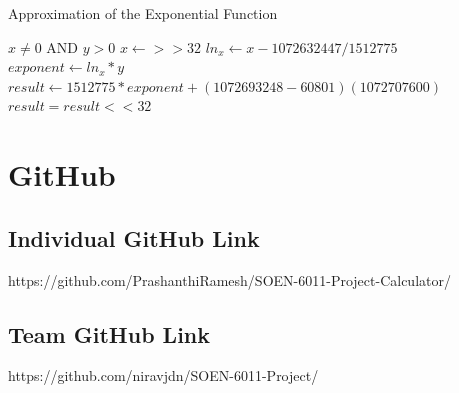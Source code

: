 \documentclass[11pt, english]{report}
\begin{document}
\begin{algorithm}
\caption{Approximation of the Exponential Function}\label{exp2}
\begin{algorithmic}[1]
\Require $x \neq 0$ AND $y > 0$
\State $x \gets >> 32$ 
\State $ln_x \gets x- 1072632447/ 1512775$
\State $exponent \gets ln_x * y$ 
\State $result \gets 1512775 * exponent +(1072693248 - 60801) (1072707600)$
\State $result= result <<32$
\end{algorithmic}
\end{algorithm}



\appendix
\chapter{GitHub}
\section{Individual GitHub Link}
https://github.com/PrashanthiRamesh/SOEN-6011-Project-Calculator/

\section{Team GitHub Link}
https://github.com/niravjdn/SOEN-6011-Project/


\printbibliography

\printglossary
\end{document}
